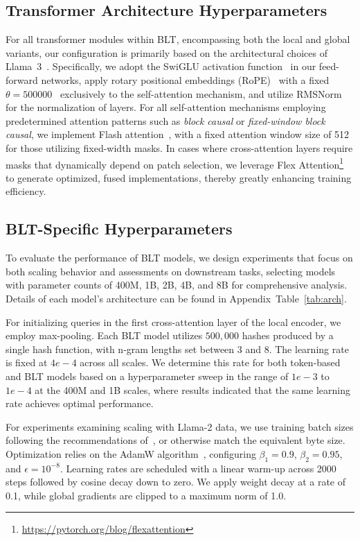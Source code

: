 \subsection{Transformer Architecture Hyperparameters} For all transformer modules within {\textsc BLT}, encompassing both the local and global variants, our configuration is primarily based on the architectural choices of Llama~3~\citep{dubey2024llama}. Specifically, we adopt the SwiGLU activation function~\citep{swiglu} in our feed-forward networks, apply rotary positional embeddings (RoPE)~\citep{RoPe} with a fixed $\theta=500000$~\citep{xiong2024effective} exclusively to the self-attention mechanism, and utilize RMSNorm \citep{RMSNorm} for the normalization of layers. For all self-attention mechanisms employing predetermined attention patterns such as \textit{block causal} or \textit{fixed-window block causal}, we implement Flash attention~\citep{dao2022flashattention}, with a fixed attention window size of 512 for those utilizing fixed-width masks. In cases where cross-attention layers require masks that dynamically depend on patch selection, we leverage Flex Attention\footnote{\url{https://pytorch.org/blog/flexattention}} to generate optimized, fused implementations, thereby greatly enhancing training efficiency.

\subsection{{\textsc BLT}-Specific Hyperparameters} To evaluate the performance of {\textsc BLT} models, we design experiments that focus on both scaling behavior and assessments on downstream tasks, selecting models with parameter counts of 400M, 1B, 2B, 4B, and 8B for comprehensive analysis. Details of each model’s architecture can be found in Appendix~Table~\ref{tab:arch}.

For initializing queries in the first cross-attention layer of the local encoder, we employ max-pooling. Each {\textsc BLT} model utilizes $500,000$ hashes produced by a single hash function, with n-gram lengths set between 3 and 8. The learning rate is fixed at $4e-4$ across all scales. We determine this rate for both token-based and {\textsc BLT} models based on a hyperparameter sweep in the range of $1e-3$ to $1e-4$ at the 400M and 1B scales, where results indicated that the same learning rate achieves optimal performance.

For experiments examining scaling with Llama-2 data, we use training batch sizes following the recommendations of~\cite{dubey2024llama}, or otherwise match the equivalent byte size. Optimization relies on the AdamW algorithm~\citep{adamw}, configuring $\beta_1 = 0.9$, $\beta_2 = 0.95$, and $\epsilon=10^{-8}$. Learning rates are scheduled with a linear warm-up across 2000 steps followed by cosine decay down to zero. We apply weight decay at a rate of 0.1, while global gradients are clipped to a maximum norm of 1.0.

